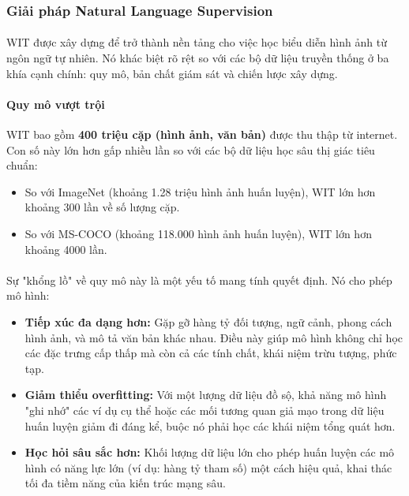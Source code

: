 \subsubsection{Giải pháp Natural Language Supervision}
\paragraph{}{WIT được xây dựng để trở thành nền tảng cho việc học biểu diễn hình ảnh từ ngôn ngữ tự nhiên. Nó khác biệt rõ rệt so với các bộ dữ liệu truyền thống ở ba khía cạnh chính: quy mô, bản chất giám sát và chiến lược xây dựng.}
\paragraph{Quy mô vượt trội}
WIT bao gồm \textbf{400 triệu cặp (hình ảnh, văn bản)} được thu thập từ internet. Con số này lớn hơn gấp nhiều lần so với các bộ dữ liệu học sâu thị giác tiêu chuẩn:
\begin{itemize}
\item So với ImageNet (khoảng 1.28 triệu hình ảnh huấn luyện), WIT lớn hơn khoảng 300 lần về số lượng cặp.
\item So với MS-COCO (khoảng 118.000 hình ảnh huấn luyện), WIT lớn hơn khoảng 4000 lần.
\end{itemize}
\paragraph{}{Sự "khổng lồ" về quy mô này là một yếu tố mang tính quyết định. Nó cho phép mô hình:}
\begin{itemize}
\item \textbf{Tiếp xúc đa dạng hơn:} Gặp gỡ hàng tỷ đối tượng, ngữ cảnh, phong cách hình ảnh, và mô tả văn bản khác nhau. Điều này giúp mô hình không chỉ học các đặc trưng cấp thấp mà còn cả các tính chất, khái niệm trừu tượng, phức tạp.
\item \textbf{Giảm thiểu overfitting:} Với một lượng dữ liệu đồ sộ, khả năng mô hình "ghi nhớ" các ví dụ cụ thể hoặc các mối tương quan giả mạo trong dữ liệu huấn luyện giảm đi đáng kể, buộc nó phải học các khái niệm tổng quát hơn.
\item \textbf{Học hỏi sâu sắc hơn:} Khối lượng dữ liệu lớn cho phép huấn luyện các mô hình có năng lực lớn (ví dụ: hàng tỷ tham số) một cách hiệu quả, khai thác tối đa tiềm năng của kiến trúc mạng sâu.
\end{itemize}
